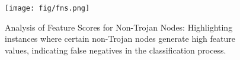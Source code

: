 \begin{figure}[!t]
\centering

\texttt{[image: fig/fns.png]}
\caption{Analysis of Feature Scores for Non-Trojan Nodes: Highlighting instances where certain non-Trojan nodes generate high feature values, indicating false negatives in the classification process.\label{fig:explainability_three}}

\end{figure}